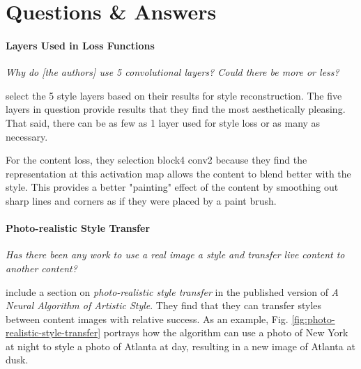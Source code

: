 \documentclass{article}
\begin{document}
\section{Questions \& Answers}

\paragraph{Layers Used in Loss Functions} \textit{Why do [the authors] use 5
convolutional layers? Could there be more or less?}

\cite{2015arXiv150806576G} select the 5 style layers based on their results
for style reconstruction. The five layers in question provide results that
they find the most aesthetically pleasing. That said, there can be as few as
1 layer used for style loss or as many as necessary.


For the content loss, they selection block4 conv2 because they find the
representation at this activation map allows the content to blend better with
the style. This provides a better "painting" effect of the content by
smoothing out sharp lines and corners as if they were placed by a paint brush.


\paragraph{Photo-realistic Style Transfer} \textit{Has there been any work to
use a real image a style and transfer live content to another content?}

\cite{gatys2016image} include a section on \textit{photo-realistic style
transfer} in the published version of \textit{A Neural Algorithm of Artistic
Style}. They find that they can transfer styles between content images with
relative success. As an example, Fig. \ref{fig:photo-realistic-style-transfer}
portrays how the algorithm can use a photo of New York at night to style a
photo of Atlanta at day, resulting in a new image of Atlanta at dusk.
\end{document}
